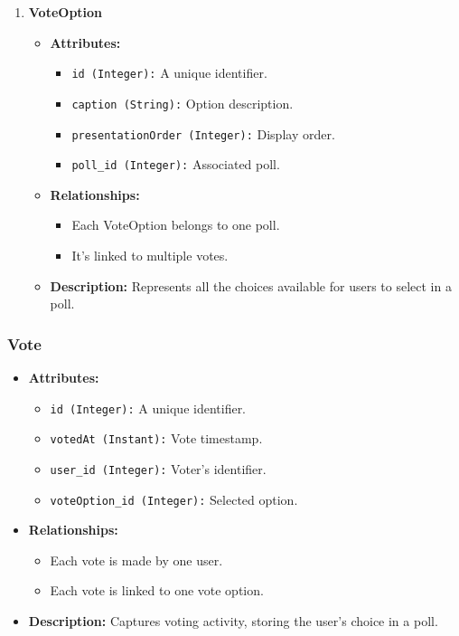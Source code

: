 \begin{enumerate}
    \item \textbf{VoteOption}
    \begin{itemize}
        \item \textbf{Attributes:}
        \begin{itemize}
            \item \texttt{id (Integer):} A unique identifier.
            \item \texttt{caption (String):} Option description.
            \item \texttt{presentationOrder (Integer):} Display order.
            \item \texttt{poll\_id (Integer):} Associated poll.
        \end{itemize}
        \item \textbf{Relationships:}
        \begin{itemize}
            \item Each VoteOption belongs to one poll.
            \item It’s linked to multiple votes.
        \end{itemize}
        \item \textbf{Description:} Represents all the choices available for users to select in a poll.
    \end{itemize}
\end{enumerate}


\subsubsection{Vote}

\begin{itemize}
    \item \textbf{Attributes:}
    \begin{itemize}
        \item \texttt{id (Integer):} A unique identifier.
        \item \texttt{votedAt (Instant):} Vote timestamp.
        \item \texttt{user\_id (Integer):} Voter's identifier.
        \item \texttt{voteOption\_id (Integer):} Selected option.
    \end{itemize}
    \item \textbf{Relationships:}
    \begin{itemize}
        \item Each vote is made by one user.
        \item Each vote is linked to one vote option.
    \end{itemize}
    \item \textbf{Description:} Captures voting activity, storing the user's choice in a poll.
\end{itemize}

